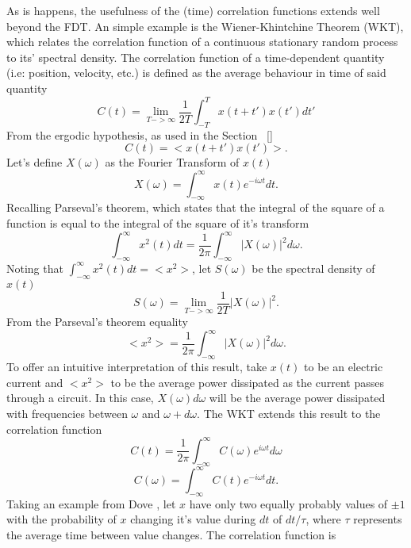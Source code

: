 As is happens, the usefulness of the (time) correlation functions extends well beyond the FDT. An simple example is the Wiener-Khintchine Theorem (WKT), which relates the correlation function of a continuous stationary random process to its' spectral density. The correlation function of a time-dependent quantity (i.e: position, velocity, etc.) is defined as the average behaviour in time of said quantity \cite{mcquarrie}
%
\begin{equation}
C(t)=\lim_{T->\infty}\frac{1}{2T}\int_{-T}^{T}x(t+t')x(t')dt'
\end{equation}
%
From the ergodic hypothesis, as used in the Section ~\ref{}%
\begin{equation}
C(t)=<x(t+t')x(t')>.
\end{equation}
%
Let's define $X(\omega)$ as the Fourier Transform of $x(t)$
%
\begin{equation}
X(\omega)=\int_{-\infty}^{\infty}x(t)e^{-i\omega t}dt.
\end{equation}
%
Recalling Parseval's theorem, which states that the integral of the square of a function is equal to the integral of the square of it's transform
%
\begin{equation}
\int_{-\infty}^{\infty}x^2(t)dt=\frac{1}{2\pi}\int_{-\infty}^{\infty}|X(\omega)|^2d\omega.
\end{equation}
%
Noting that $\int_{-\infty}^{\infty}x^2(t)dt=<x^2>$, let $S(\omega)$ be the spectral density of $x(t)$
%
\begin{equation}
S(\omega)=\lim_{T->\infty}\frac{1}{2T}|X(\omega)|^2.
\end{equation}
%
From the Parseval's theorem equality
%
\begin{equation}
<x^2>=\frac{1}{2\pi}\int_{-\infty}^{\infty}|X(\omega)|^2d\omega.
\end{equation}
%
To offer an intuitive interpretation of this result, take $x(t)$ to be an electric current and $<x^2>$ to be the average power dissipated as the current passes through a circuit. In this case, $X(\omega)d\omega$ will be the average power dissipated with frequencies between $\omega$ and $\omega+d\omega$. The WKT extends this result to the correlation function
%
\begin{equation}
C(t)=\frac{1}{2\pi}\int_{-\infty}^{\infty}C(\omega)e^{i\omega t}d\omega
\end{equation}
%
\begin{equation}
C(\omega)=\int_{-\infty}^{\infty}C(t)e^{-i\omega t}dt.
\end{equation}
%
Taking an example from Dove \cite{dove_introduction_1993-3}, let $x$ have only two equally probably values of $\pm 1$ with the probability of $x$ changing it's value during $dt$ of $dt/\tau$, where $\tau$ represents the average time between value changes. The correlation function is
